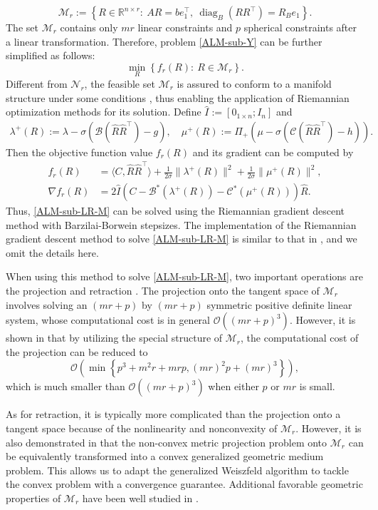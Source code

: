 \documentclass[11pt]{article}
\theoremstyle{plain}
\def\<{\big\langle}
\def\>{\big\rangle}
\def\M{\mathcal{M}}
\def\B{\mathcal{B}}
\def\C{\mathcal{C}}
\def\N{\mathcal{N}}
\def\O{\mathcal{O}}
\def\hR{\widehat{R}}
\begin{document}
\begin{equation*}
\mathcal{M}_r := \left\{R \in \mathbb{R}^{n \times r} :\  AR=be_1^\top,\ \operatorname{diag}_B(RR^{\top})=R_B e_1 \right\}.
\end{equation*}
The set $\M_r$  contains only $mr$ linear constraints and $p$ spherical constraints after a linear transformation.
Therefore, problem \eqref{ALM-sub-Y} can be further simplified as follows:
\begin{equation}
\label{ALM-sub-LR-M}
\min_R\left\{f_r(R) :\ R\in \M_r\right\}.
\tag{LR}
\end{equation}
Different from $\N_r$, the feasible set $\M_r$ is assured to conform to a manifold structure under some conditions \cite{RiNNAL},
thus enabling the application of Riemannian optimization methods for its solution. Define $\widehat{I}:=[0_{1\times n};I_n]$ and 
\begin{align*}
\lambda^{+}(R) :=\lambda-\sigma(\B(\hR \hR^\top)-g),\quad
\mu^{+}(R) :=\Pi_{+}(\mu-\sigma(\C(\hR \hR^\top)-h)).
\end{align*}
Then the objective function value $f_r(R)$ and its gradient can be computed by
\begin{align*}
f_r(R)&=\<C,\hR \hR^\top\>+\frac{1}{2\sigma}\|\lambda^+(R) \|^2+\frac{1}{2\sigma}\| \mu^+(R) \|^2\label{AL-val-general},\\
\nabla f_r(R) &= 2\widehat{I}\left( C-\B^*\left(\lambda^+(R)\right)- \C^*\left(\mu^+(R)\right)\right) \hR.
\end{align*}
Thus, \eqref{ALM-sub-LR-M} can be solved using the Riemannian gradient descent method with Barzilai-Borwein stepsizes. 
The implementation of the Riemannian gradient descent method to solve
\eqref{ALM-sub-LR-M} is similar to that in \cite{RiNNAL}, and we omit the 
details here.

When using this method to solve \eqref{ALM-sub-LR-M}, two important operations are the projection
and retraction \cite{manibook,intromani}.
The projection onto the tangent space of $\M_r$ involves solving an $(mr+p)$ by $(mr+p)$ symmetric positive definite linear system, whose computational cost is in general $\O((mr+p)^3).$ However, it is shown in \cite{RiNNAL} that by utilizing the special structure of $\M_r$, the computational cost of the projection can be reduced to $$\O\left(\min\left\{ p^3+m^2r+mrp, (mr)^2p+(mr)^3\right\}\right),$$ which is much smaller than $\O((mr+p)^3)$ when either $p$ or $mr$ is small.

As for retraction, it is typically more complicated than the projection onto a tangent space because of the nonlinearity and nonconvexity of $\M_r$. However, it is also demonstrated in \cite{RiNNAL} that the non-convex metric projection problem onto $\M_r$ can be equivalently transformed into a convex generalized geometric medium problem. This allows us to adapt the generalized Weiszfeld algorithm to tackle the convex problem with a convergence guarantee. Additional favorable geometric properties of $\mathcal{M}_r$ have been well studied in \cite{tang2024solving,RiNNAL}.
\end{document}
